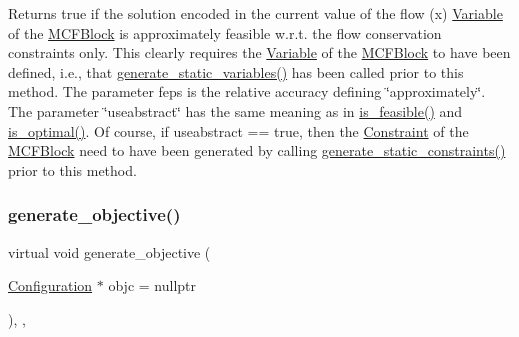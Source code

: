 Returns true if the solution encoded in the current value of the flow (x) \mbox{\hyperlink{class_s_m_spp__di__unipi__it_1_1_variable}{Variable}} of the \mbox{\hyperlink{class_s_m_spp__di__unipi__it_1_1_m_c_f_block}{M\+C\+F\+Block}} is approximately feasible w.\+r.\+t. the flow conservation constraints only. This clearly requires the \mbox{\hyperlink{class_s_m_spp__di__unipi__it_1_1_variable}{Variable}} of the \mbox{\hyperlink{class_s_m_spp__di__unipi__it_1_1_m_c_f_block}{M\+C\+F\+Block}} to have been defined, i.\+e., that \mbox{\hyperlink{class_s_m_spp__di__unipi__it_1_1_m_c_f_block_a599bd50cdc6123555aa4a6c4e22c996d}{generate\+\_\+static\+\_\+variables()}} has been called prior to this method. The parameter feps is the relative accuracy defining \char`\"{}approximately\char`\"{}. The parameter \char`\"{}useabstract\char`\"{} has the same meaning as in \mbox{\hyperlink{class_s_m_spp__di__unipi__it_1_1_m_c_f_block_a162cd7d8375d705f0b15d8e847098763}{is\+\_\+feasible()}} and \mbox{\hyperlink{class_s_m_spp__di__unipi__it_1_1_m_c_f_block_a0b1e7ff87a97e692c97f52f096f6eb50}{is\+\_\+optimal()}}. Of course, if useabstract == true, then the \mbox{\hyperlink{class_s_m_spp__di__unipi__it_1_1_constraint}{Constraint}} of the \mbox{\hyperlink{class_s_m_spp__di__unipi__it_1_1_m_c_f_block}{M\+C\+F\+Block}} need to have been generated by calling \mbox{\hyperlink{class_s_m_spp__di__unipi__it_1_1_m_c_f_block_a33f94035590874ef8616982e11e7bb43}{generate\+\_\+static\+\_\+constraints()}} prior to this method. \mbox{\label{class_s_m_spp__di__unipi__it_1_1_m_c_f_block_aa2b7e92a516434c33f247eef8574fb94}} 
\subsubsection{\texorpdfstring{generate\+\_\+objective()}{generate\_objective()}}
{\footnotesize\ttfamily virtual void generate\+\_\+objective (\begin{DoxyParamCaption}\item[{\mbox{\hyperlink{class_s_m_spp__di__unipi__it_1_1_configuration}{Configuration}} $\ast$}]{objc = {\ttfamily nullptr} }\end{DoxyParamCaption})\hspace{0.3cm}{\ttfamily [final]}, {\ttfamily [override]}, {\ttfamily [virtual]}}



